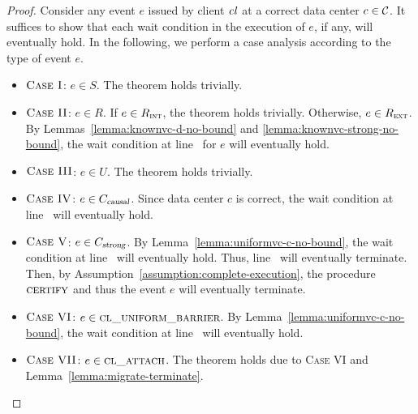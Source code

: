 \begin{proof} \label{proof:termination}
  Consider any event $e$ issued by client $\mathit{cl}$
  at a correct data center $c \in \mathcal{C}$.
  It suffices to show that each wait condition in the execution of $e$,
  if any, will eventually hold.
  In the following, we perform a case analysis
  according to the type of event $e$.
  \begin{itemize}
    \item $\textsc{Case I}$: $e \in S$.
      The theorem holds trivially.
    \item $\textsc{Case II}$: $e \in R$.
      If $e \in R_{\textsc{int}}$, the theorem holds trivially.
      Otherwise, $e \in R_{\textsc{ext}}$.
      By Lemmas~\ref{lemma:knownvc-d-no-bound}
      and \ref{lemma:knownvc-strong-no-bound},
      the wait condition at
      line~\code{\ref{alg:unistore-replica}}{\ref{line:readkey-wait-util-knownvc}}
      for $e$ will eventually hold.
    \item $\textsc{Case III}$: $e \in U$.
      The theorem holds trivially.
    \item $\textsc{Case IV}$: $e \in C_{\textsl{causal}}$.
      Since data center $c$ is correct,
      the wait condition at
      line~\code{\ref{alg:unistore-coord}}{\ref{line:commitcausal-wait-prepareack}}
      will eventually hold.
    \item $\textsc{Case V}$: $e \in C_{\textsl{strong}}$.
      By Lemma~\ref{lemma:uniformvc-c-no-bound},
      the wait condition at
      line~\code{\ref{alg:unistore-replica}}{\ref{line:uniformbarrier-wait-uniformvc-d}}
      will eventually hold.
      Thus, line~\code{\ref{alg:unistore-strong-commit}}{\ref{line:commitstrong-call-uniformbarrier}}
      will eventually terminate.
      Then, by Assumption~\ref{assumption:complete-execution},
      the procedure $\textsc{certify}$ and thus the event $e$ will eventually terminate.
    \item $\textsc{Case VI}$: $e \in \textsc{cl\_uniform\_barrier}$.
      By Lemma~\ref{lemma:uniformvc-c-no-bound},
      the wait condition at
      line~\code{\ref{alg:unistore-replica}}{\ref{line:uniformbarrier-wait-uniformvc-d}}
      will eventually hold.
    \item $\textsc{Case VII}$: $e \in \textsc{cl\_attach}$.
      The theorem holds due to \textsc{Case VI} and Lemma~\ref{lemma:migrate-terminate}.
  \end{itemize}
\end{proof}
